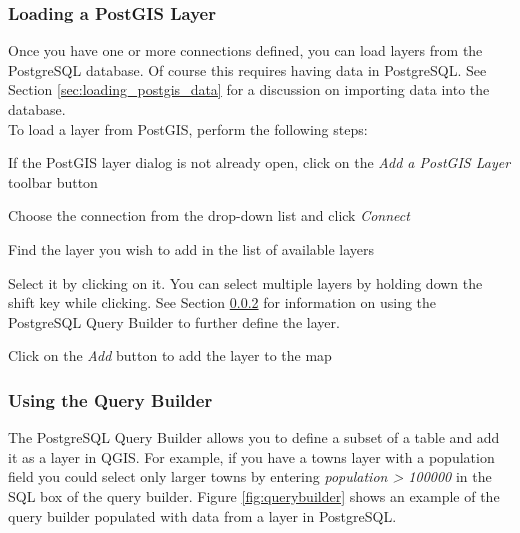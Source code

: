 \documentclass[10pt,english]{article}
\begin{document}
\begin{onehalfspace}
\subsubsection{Loading a PostGIS Layer}
Once you have one or more connections defined, you can load layers from the PostgreSQL database. Of course this requires having data in PostgreSQL. See Section \ref{sec:loading_postgis_data} for a discussion on importing data into the database. \\

To load a layer from PostGIS, perform the following steps:
\begin{compactenum}
\item If the PostGIS layer dialog is not already open, click on the \textit{Add a PostGIS Layer} toolbar button
\item Choose the connection from the drop-down list and click \textsl{Connect}
\item Find the layer you wish to add in the list of available layers
\item Select it by clicking on it. You can select multiple layers by holding down the shift key while clicking. See Section \ref{sec:query_builder} for information on using the PostgreSQL Query Builder to further define the layer.
\item Click on the \textsl{Add} button to add the layer to the map
\end{compactenum}
\subsubsection{Using the Query
Builder}\label{sec:query_builder}
The PostgreSQL Query Builder allows you to define a subset of a table and add it
as a layer in QGIS.  For example, if you have a towns layer with a population
field you could select only larger towns by entering \textsl{population >
100000} in the SQL box of the query builder. Figure \ref{fig:querybuilder} shows an
example of the query builder populated with data from a layer in PostgreSQL. 


\end{onehalfspace}
\end{document}
